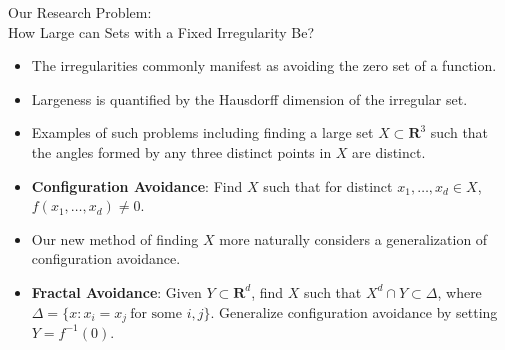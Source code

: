 \documentclass[final]{beamer}
\newlength{\onecolwid}
\newlength{\twocolwid}
\begin{document}
\begin{frame}[t]
\begin{columns}[t]
\begin{column}{\twocolwid}
\begin{columns}[t,totalwidth=\twocolwid]
\begin{column}{\onecolwid}


\end{column} %

\begin{column}{\onecolwid}\vspace{-.6in} %



\end{column} %

\end{columns} %


\begin{alertblock}{Our Research Problem:\\How Large can Sets with a Fixed Irregularity Be?}
\begin{itemize}
\item The irregularities commonly manifest as avoiding the zero set of a function.
\item Largeness is quantified by the Hausdorff dimension of the irregular set.
\item Examples of such problems including finding a large set $X \subset \mathbf{R}^3$ such that the angles formed by any three distinct points in $X$ are distinct.
\item {\bf Configuration Avoidance}: Find $X$ such that for distinct $x_1, \dots, x_d \in X$, $f(x_1, \dots, x_d) \neq 0$. 
\item Our new method of finding $X$ more naturally considers a generalization of configuration avoidance.
\item {\bf Fractal Avoidance}: Given $Y \subset \mathbf{R}^d$, find $X$ such that $X^d \cap Y \subset \Delta$, where $\Delta = \{ x : x_i = x_j\ \text{for some $i,j$} \}$. Generalize configuration avoidance by setting $Y = f^{-1}(0)$.


\end{itemize}
\end{alertblock}
\end{column}
\end{columns}
\end{frame}
\end{document}
